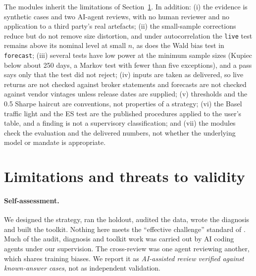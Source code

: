 \documentclass[11pt]{article}
\begin{document}
The modules inherit the limitations of Section~\ref{sec:limits}. In addition: (i) the evidence is synthetic cases and two AI-agent reviews, with no human reviewer and no application to a third party's real artefacts; (ii) the small-sample corrections reduce but do not remove size distortion, and under autocorrelation the \texttt{live} test remains above its nominal level at small $n$, as does the Wald bias test in \texttt{forecast}; (iii) several tests have low power at the minimum sample sizes (Kupiec below about 250 days, a Markov test with fewer than five exceptions), and a pass says only that the test did not reject; (iv) inputs are taken as delivered, so live returns are not checked against broker statements and forecasts are not checked against vendor vintages unless release dates are supplied; (v) thresholds and the 0.5 Sharpe haircut are conventions, not properties of a strategy; (vi) the Basel traffic light and the ES test are the published procedures applied to the user's table, and a finding is not a supervisory classification; and (vii) the modules check the evaluation and the delivered numbers, not whether the underlying model or mandate is appropriate.

\section{Limitations and threats to validity}\label{sec:limits}

\paragraph{Self-assessment.} We designed the strategy, ran the holdout, audited the data, wrote the diagnosis and built the toolkit. Nothing here meets the ``effective challenge'' standard of \citet{SR117}. Much of the audit, diagnosis and toolkit work was carried out by AI coding agents under our supervision. The cross-review was one agent reviewing another, which shares training biases. We report it as \emph{AI-assisted review verified against known-answer cases}, not as independent validation.
\end{document}
